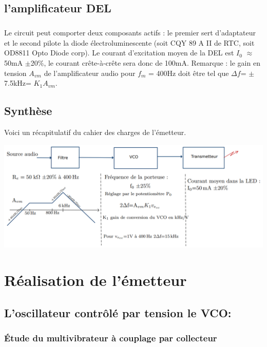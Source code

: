 \documentclass[a4paper]{report}
\begin{document}
\section{l'amplificateur DEL}
\paragraph{}
Le circuit peut comporter deux composants actifs : le premier sert d'adaptateur et le second pilote la diode électroluminescente (soit CQY 89 A II de RTC, soit OD8811 Opto Diode corp). Le courant d'excitation moyen de la DEL est $I_0$ $\approx$ 50mA $\pm$20$\%$, le courant crête-à-crête sera donc de 100mA.
%
Remarque :  le gain en tension $A_{vm}$ de l'amplificateur audio pour $f_m$ = 400Hz doit être tel que $\Delta f$= $\pm$7.5kHz= $K_1A_{vm}$.


\newpage
\section{Synthèse}

Voici un récapitulatif du cahier des charges de l'émetteur.\\
\begin{center}
\includegraphics[width=1\textwidth]{resume.PNG}
\end{center}



\chapter{Réalisation de l'émetteur}

\section{L'oscillateur contrôlé par tension le VCO:}

\subsection{Étude du multivibrateur à couplage par collecteur}
\end{document}
